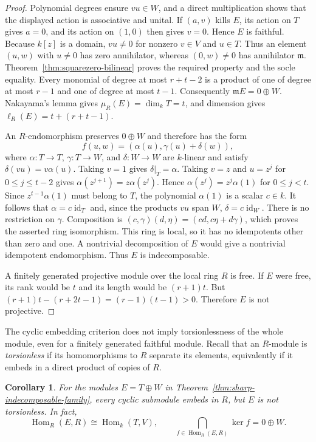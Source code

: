 \documentclass[11pt]{amsart}
\theoremstyle{plain}
\newtheorem{corollary}[theorem]{Corollary}
\theoremstyle{definition}
\theoremstyle{remark}
\DeclareMathOperator{\Hom}{Hom}
\numberwithin{equation}{section}
\begin{document}
\begin{proof}
Polynomial degrees ensure $vu\in W$, and a direct multiplication
shows that the displayed action is associative and unital.
If $(a,v)$ kills $E$, its action on $T$ gives $a=0$, and its action
on $(1,0)$ then gives $v=0$. Hence $E$ is faithful.
Because $k[z]$ is a domain, $vu\ne0$ for nonzero $v\in V$ and
$u\in T$. Thus an element $(u,w)$ with $u\ne0$ has zero
annihilator, whereas $(0,w)\ne0$ has annihilator $\mathfrak m$.
Theorem~\ref{thm:squarezero-bilinear} proves the required property
and the socle equality.
Every monomial of degree at most $r+t-2$ is a product of one of degree
at most $r-1$ and one of degree at most $t-1$.
Consequently $\mathfrak mE=0\oplus W$.
Nakayama's lemma gives $\mu_R(E)=\dim_kT=t$, and dimension gives
$\ell_R(E)=t+(r+t-1)$.

An $R$-endomorphism preserves $0\oplus W$ and therefore has the form
\[
 f(u,w)=(\alpha(u),\gamma(u)+\delta(w)),
\]
where $\alpha:T\to T$, $\gamma:T\to W$, and $\delta:W\to W$
are $k$-linear and satisfy $\delta(vu)=v\alpha(u)$.
Taking $v=1$ gives $\delta|_T=\alpha$.
Taking $v=z$ and $u=z^j$ for $0\le j\le t-2$ gives
$\alpha(z^{j+1})=z\alpha(z^j)$.
Hence $\alpha(z^j)=z^j\alpha(1)$ for $0\le j<t$.
Since $z^{t-1}\alpha(1)$ must belong to $T$, the polynomial
$\alpha(1)$ is a scalar $c\in k$.
It follows that $\alpha=c\operatorname{id}_T$ and, since the products
$vu$ span $W$, $\delta=c\operatorname{id}_W$.
There is no restriction on $\gamma$.
Composition is
$(c,\gamma)(d,\eta)=(cd,c\eta+d\gamma)$, which proves the asserted
ring isomorphism. This ring is local, so it has no idempotents other
than zero and one. A nontrivial decomposition of $E$ would give a
nontrivial idempotent endomorphism. Thus $E$ is indecomposable.

A finitely generated projective module over the local ring $R$ is free.
If $E$ were free, its rank would be $t$ and its length would be
$(r+1)t$. But
$(r+1)t-(r+2t-1)=(r-1)(t-1)>0$.
Therefore $E$ is not projective.
\end{proof}

The cyclic embedding criterion does not imply torsionlessness of the
whole module, even for a finitely generated faithful module. Recall that
an $R$-module is \emph{torsionless} if its homomorphisms to $R$ separate
its elements, equivalently if it embeds in a direct product of copies of $R$.

\begin{corollary}\label{cor:cyclic-not-torsionless}
For the modules $E=T\oplus W$ in
Theorem~\ref{thm:sharp-indecomposable-family}, every cyclic submodule
embeds in $R$, but $E$ is not torsionless. In fact,
\[
 \Hom_R(E,R)\cong\Hom_k(T,V),\qquad
 \bigcap_{f\in\Hom_R(E,R)}\ker f=0\oplus W.
\]
\end{corollary}
\end{document}
